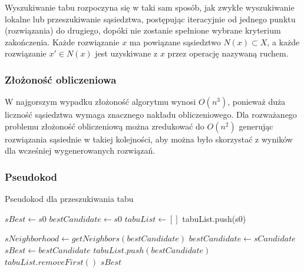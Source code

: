 \documentclass[12pt,a4paper,titlepage]{article}
\begin{document}
Wyszukiwanie tabu rozpoczyna się w taki sam sposób, jak zwykłe wyszukiwanie lokalne lub przeszukiwanie sąsiedztwa, postępując iteracyjnie od jednego punktu (rozwiązania) do drugiego, dopóki nie zostanie spełnione wybrane kryterium zakończenia. Każde rozwiązanie $x$ ma powiązane sąsiedztwo $N(x) \subset X$, a każde rozwiązanie $x' \in N(x)$ jest uzyskiwane z $x$ przez operację nazywaną ruchem.

\subsubsection{Złożoność obliczeniowa}
W najgorszym wypadku złożoność algorytmu wynosi $O(n^3)$, ponieważ duża liczność sąsiedztwa wymaga  znacznego  nakładu  obliczeniowego.
Dla rozważanego  problemu złożoność obliczeniową można zredukować do $O(n^2)$ generując rozwiązania sąsiednie w takiej kolejności, aby  można było skorzystać z wyników  dla  wcześniej  wygenerowanych rozwiązań.\cite{zeszyty_naukowe}

\subsubsection{Pseudokod}
\begin{algorithm}[H]
\caption{Pseudokod dla przeszukiwania tabu\cite{wiki_ts}}
\begin{algorithmic}
\State $sBest \gets s0$
\State $bestCandidate \gets s0$
\State $tabuList \gets []$
\State tabuList.push(s0)

	\State $sNeighborhood \gets getNeighbors(bestCandidate)$
			\State $bestCandidate \gets sCandidate$
		\EndIf
	\EndFor
		\State $sBest \gets bestCandidate$
	\EndIf
	\State $tabuList.push(bestCandidate)$
		\State $tabuList.removeFirst()$
    \EndIf
\EndWhile
\State \Return $sBest$
\end{algorithmic}
\end{algorithm}
\end{document}
